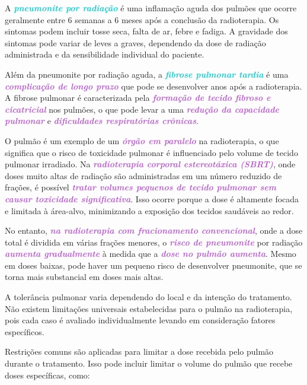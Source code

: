 \documentclass[11pt,a4paper]{article}
\newcounter{exemplo}
\begin{document}
	A \textcolor{DarkTurquoise}{\textbf{\textit{pneumonite por radiação}}} é uma inflamação aguda dos pulmões que ocorre geralmente entre 6 semanas a 6 meses após a conclusão da radioterapia. Os sintomas podem incluir tosse seca, falta de ar, febre e fadiga. A gravidade dos sintomas pode variar de leves a graves, dependendo da dose de radiação administrada e da sensibilidade individual do paciente.

	Além da pneumonite por radiação aguda, a \textcolor{DarkTurquoise}{\textbf{\textit{fibrose pulmonar tardia}}} é uma \textcolor{MediumOrchid}{\textbf{\textit{complicação de longo prazo}}} que pode se desenvolver anos após a radioterapia. A fibrose pulmonar é caracterizada pela \textcolor{MediumOrchid}{\textbf{\textit{formação de tecido fibroso e cicatricial}}} nos pulmões, o que pode levar a uma \textcolor{MediumOrchid}{\textbf{\textit{redução da capacidade pulmonar}}} e \textcolor{MediumOrchid}{\textbf{\textit{dificuldades respiratórias crônicas}}}.

	O pulmão é um exemplo de um \textcolor{MediumOrchid}{\textbf{\textit{órgão em paralelo}}} na radioterapia, o que significa que o risco de toxicidade pulmonar é influenciado pelo volume de tecido pulmonar irradiado.	Na \textcolor{MediumOrchid}{\textbf{\textit{radioterapia corporal estereotáxica (SBRT)}}}, onde doses muito altas de radiação são administradas em um número reduzido de frações, é possível \textcolor{MediumOrchid}{\textbf{\textit{tratar volumes pequenos de tecido pulmonar sem causar toxicidade significativa}}}. Isso ocorre porque a dose é altamente focada e limitada à área-alvo, minimizando a exposição dos tecidos saudáveis ao redor.

	No entanto, \textcolor{MediumOrchid}{\textbf{\textit{na radioterapia com fracionamento convencional}}}, onde a dose total é dividida em várias frações menores, o \textcolor{MediumOrchid}{\textbf{\textit{risco de pneumonite}}} por radiação \textcolor{MediumOrchid}{\textbf{\textit{aumenta gradualmente}}} à medida que a \textcolor{MediumOrchid}{\textbf{\textit{dose no pulmão aumenta}}}. Mesmo em doses baixas, pode haver um pequeno risco de desenvolver pneumonite, que se torna mais substancial em doses mais altas.

	A tolerância pulmonar varia dependendo do local e da intenção do tratamento. Não existem limitações universais estabelecidas para o pulmão na radioterapia, pois cada caso é avaliado individualmente levando em consideração fatores específicos.

	Restrições comuns são aplicadas para limitar a dose recebida pelo pulmão durante o tratamento. Isso pode incluir limitar o volume do pulmão que recebe doses específicas, como:
\end{document}
